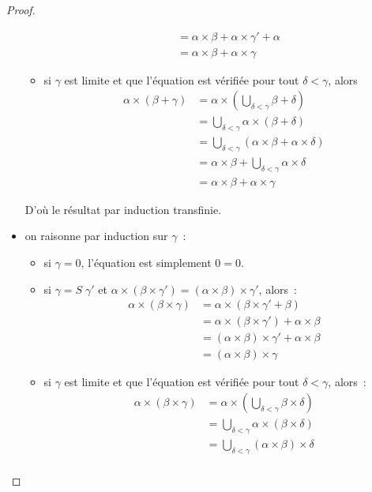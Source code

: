 \begin{proof}
\begin{itemize}
\begin{itemize}
\begin{align*}
        &= \alpha \times \beta + \alpha \times \gamma' + \alpha\\
        &= \alpha \times \beta + \alpha \times \gamma
      \end{align*}
    \item si $\gamma$ est limite et que l'équation est vérifiée pour tout
      $\delta < \gamma$, alors
      \begin{align*}
        \alpha \times (\beta + \gamma) &= \alpha \times
        (\bigcup_{\delta < \gamma} \beta + \delta)\\
        &= \bigcup_{\delta < \gamma} \alpha \times (\beta + \delta)\\
        &= \bigcup_{\delta < \gamma} (\alpha\times\beta + \alpha\times \delta)\\
        &= \alpha \times \beta + \bigcup_{\delta < \gamma} \alpha \times \delta\\
        &= \alpha \times \beta + \alpha \times \gamma
      \end{align*}
    \end{itemize}
    D'où le résultat par induction transfinie.
  \item on raisonne par induction sur $\gamma$~:
    \begin{itemize}
    \item si $\gamma = 0$, l'équation est simplement $0 = 0$.
    \item si $\gamma = S\;\gamma'$ et
      $\alpha \times (\beta\times\gamma') = (\alpha\times\beta)\times\gamma'$,
      alors~:
      \begin{align*}
        \alpha \times (\beta \times \gamma) &=
        \alpha \times (\beta\times \gamma' + \beta) \\
        &= \alpha \times (\beta\times \gamma') +
        \alpha \times \beta\\
        &= (\alpha \times \beta) \times \gamma' + \alpha \times \beta\\
        &= (\alpha \times \beta) \times \gamma
      \end{align*}
    \item si $\gamma$ est limite et que l'équation est vérifiée pour tout
      $\delta < \gamma$, alors~:
      \begin{align*}
        \alpha \times (\beta \times \gamma) &= \alpha \times
        (\bigcup_{\delta < \gamma} \beta \times \delta)\\
        &= \bigcup_{\delta < \gamma} \alpha \times (\beta \times \delta)\\
        &= \bigcup_{\delta < \gamma} (\alpha \times \beta) \times \delta\\

\end{align*}
\end{itemize}
\end{itemize}
\end{proof}
